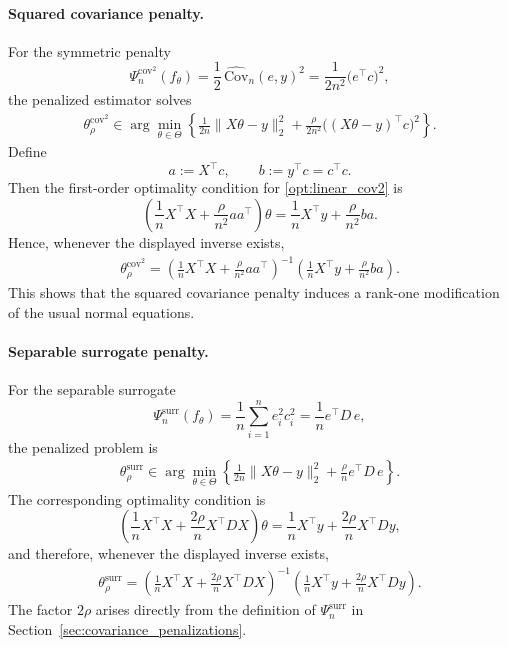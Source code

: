 \documentclass[12pt, draft]{article}
\theoremstyle{plain}
\theoremstyle{definition}
\newcommand{\1}{\mathbf{1}}
\newcommand{\Cov}{\text{Cov}}
\begin{document}
\paragraph{Squared covariance penalty.}
For the symmetric penalty
\[
\Psi_n^{\mathrm{cov}^2}(f_\theta)
=
\frac{1}{2}\,\widehat{\Cov}_n(e,y)^2
=
\frac{1}{2n^2}\bigl(e^\top c\bigr)^2,
\]
the penalized estimator solves
\begin{align}
    \label{opt:linear_cov2}
    \theta_{\rho}^{\mathrm{cov}^2}
    \in
    \arg\min_{\theta\in\Theta}
    \left\{
        \frac{1}{2n}\|X\theta-y\|_2^2
        +
        \frac{\rho}{2n^2}\bigl((X\theta-y)^\top c\bigr)^2
    \right\}.
\end{align}
Define
\[
a := X^\top c,
\qquad
b := y^\top c = c^\top c.
\]
Then the first-order optimality condition for \eqref{opt:linear_cov2} is
\[
\left(
\frac{1}{n}X^\top X + \frac{\rho}{n^2}aa^\top
\right)\theta
=
\frac{1}{n}X^\top y + \frac{\rho}{n^2}ba.
\]
Hence, whenever the displayed inverse exists,
\begin{align}
    \label{eq:linear_cov2_closed_form}
    \theta_{\rho}^{\mathrm{cov}^2}
    =
    \left(
        \frac{1}{n}X^\top X
        +
        \frac{\rho}{n^2}aa^\top
    \right)^{-1}
    \left(
        \frac{1}{n}X^\top y
        +
        \frac{\rho}{n^2}ba
    \right).
\end{align}
This shows that the squared covariance penalty induces a rank-one modification of the usual normal equations.

\paragraph{Separable surrogate penalty.}
For the separable surrogate
\[
\Psi_n^{\mathrm{surr}}(f_\theta)
=
\frac{1}{n}\sum_{i=1}^n e_i^2 c_i^2
=
\frac{1}{n}e^\top D\,e,
\]
the penalized problem is
\begin{align}
    \label{opt:linear_surr}
    \theta_{\rho}^{\mathrm{surr}}
    \in
    \arg\min_{\theta\in\Theta}
    \left\{
        \frac{1}{2n}\|X\theta-y\|_2^2
        +
        \frac{\rho}{n}e^\top D\,e
    \right\}.
\end{align}
The corresponding optimality condition is
\[
\left(
\frac{1}{n}X^\top X
+
\frac{2\rho}{n}X^\top D X
\right)\theta
=
\frac{1}{n}X^\top y
+
\frac{2\rho}{n}X^\top D y,
\]
and therefore, whenever the displayed inverse exists,
\begin{align}
    \label{eq:linear_surr_closed_form}
    \theta_{\rho}^{\mathrm{surr}}
    =
    \left(
        \frac{1}{n}X^\top X
        +
        \frac{2\rho}{n}X^\top D X
    \right)^{-1}
    \left(
        \frac{1}{n}X^\top y
        +
        \frac{2\rho}{n}X^\top D y
    \right).
\end{align}
The factor \(2\rho\) arises directly from the definition of \(\Psi_n^{\mathrm{surr}}\) in Section~\ref{sec:covariance_penalizations}.
\end{document}
